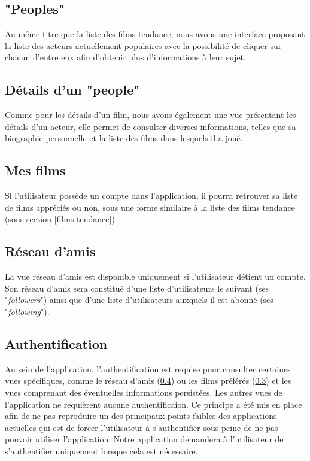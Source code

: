\subsection{"Peoples"}
Au même titre que la liste des films tendance, nous avons une interface proposant la liste des acteurs actuellement populaires avec la possibilité de cliquer sur chacun d'entre eux afin d'obtenir plus d'informations à leur sujet.

\subsection{Détails d'un "people"}
Comme pour les détails d'un film, nous avons également une vue présentant les détails d'un acteur, elle permet de consulter diverses informations, telles que sa biographie personnelle et la liste des films dans lesquels il a joué.

\subsection{Mes films}\label{mes-films}
Si l'utilisateur possède un compte dans l'application, il pourra retrouver sa liste de films appréciés ou non, sous une forme similaire à la liste des films tendance (sous-section \ref{films-tendance}).

\subsection{Réseau d'amis}\label{reseau-amis}
La vue réseau d'amis est disponible uniquement si l'utilisateur détient un compte. Son réseau d'amis sera constitué d'une liste d'utilisateurs le suivant (ses "\textit{followers}") ainsi que d'une liste d'utilisateurs auxquels il est abonné (ses "\textit{following}").

\subsection{Authentification}
Au sein de l'application, l'authentification est requise pour consulter certaines vues spécifiques, comme le réseau d'amis (\ref{reseau-amis}) ou les films préférés (\ref{mes-films}) et les vues comprenant des éventuelles informations persistées.
Les autres vues de l'application ne requièrent aucune authentificaion. Ce principe a été mis en place afin de ne pas reproduire un des principaux points faibles des applications actuelles qui est de forcer l'utilisateur à s'authentifier sous peine de ne pas pouvoir utiliser l'application. Notre application demandera à l'utilisateur de s'authentifier uniquement lorsque cela est nécessaire.
 
